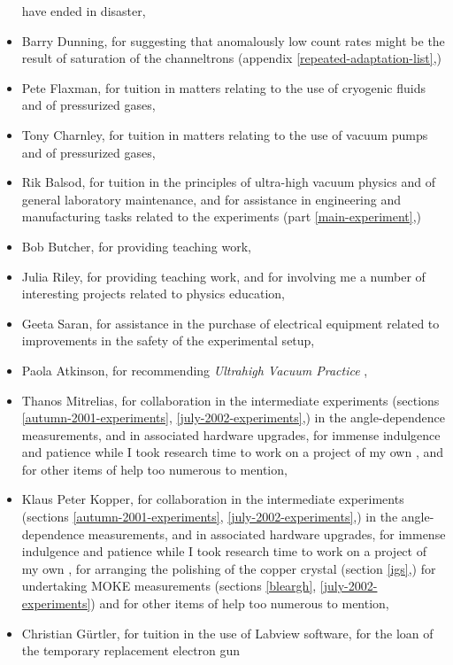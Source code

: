 \begin{itemize}
  have ended in disaster,
\item{}Barry Dunning, for suggesting that anomalously low count rates
  might be the result of saturation of the channeltrons (appendix
  \ref{repeated-adaptation-list},)
\item{}Pete Flaxman, for tuition in matters relating to the use of
  cryogenic fluids and of pressurized gases,
\item{}Tony Charnley, for tuition in matters relating to the use of
  vacuum pumps and of pressurized gases,
\item{}Rik Balsod, for tuition in the principles of ultra-high vacuum
  physics and of general laboratory maintenance, and for assistance in
  engineering and manufacturing tasks related to the experiments (part
  \ref{main-experiment},)
\item{}Bob Butcher, for providing teaching work,
\item{}Julia Riley, for providing teaching work, and for involving me
  a number of interesting projects related to physics education,
\item{}Geeta Saran, for assistance in the purchase of electrical
  equipment related to improvements in the safety of the experimental
  setup,
\item{}Paola Atkinson, for recommending \emph{Ultrahigh Vacuum
    Practice} \cite{Weston:1985:UVP},
\item{}Thanos Mitrelias, for collaboration in the intermediate
  experiments (sections \ref{autumn-2001-experiments},
  \ref{july-2002-experiments},) in the angle-dependence measurements,
  and in associated hardware upgrades, for immense indulgence and
  patience while I took research time to work on a project of my own
  \cite{Hatton:2002:BPR}, and for other items of help too numerous to
  mention,
\item{}Klaus Peter Kopper, for collaboration in the intermediate
  experiments (sections \ref{autumn-2001-experiments},
  \ref{july-2002-experiments},) in the angle-dependence measurements,
  and in associated hardware upgrades, for immense indulgence and
  patience while I took research time to work on a project of my own
  \cite{Hatton:2002:BPR}, for arranging the polishing of the copper
  crystal (section \ref{igs},) for undertaking MOKE measurements
  (sections \ref{bleargh}, \ref{july-2002-experiments}) and for other
  items of help too numerous to mention,
\item{}Christian G\"urtler, for tuition in the use of Labview
  software, for the loan of the temporary replacement electron gun

\end{itemize}
